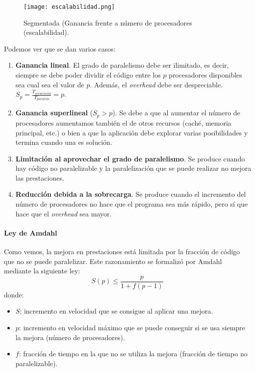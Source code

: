 \documentclass[12pt,spanish]{article}
\begin{document}
\begin{figure}[H]
	\centering
	\texttt{[image: escalabilidad.png]}
	\caption{Segmentada (Ganancia frente a número de procesadores (escalabilidad).}
\end{figure}

Podemos ver que se dan varios casos:
\begin{enumerate}
	\item \textbf{Ganancia lineal}. El grado de paralelismo debe ser ilimitado, es decir, siempre se debe poder dividir el código entre los $p$ procesadores disponibles sea cual sea el valor de $p$. Además, el \textit{overhead} debe ser despreciable. $S_p=\frac{T_{secuencial}}{T_{paralelo}}=p$.
	\item \textbf{Ganancia superlineal} ($S_p>p$). Se debe a que al aumentar el número de procesadores aumentamos también el de otros recursos (caché, memoria principal, etc.) o bien a que la aplicación debe explorar varias posibilidades y termina cuando una es solución. 
	\item \textbf{Limitación al aprovechar el grado de paralelismo}. Se produce cuando hay código no paralelizable y la paralelización que se puede realizar no mejora las prestaciones.
	\item \textbf{Reducción debida a la sobrecarga}. Se produce cuando el incremento del número de procesadores no hace que el programa sea más rápido, pero sí que hace que el \textit{overhead} sea mayor.
\end{enumerate}


\paragraph{Ley de Amdahl}

Como vemos, la mejora en prestaciones está limitada por la fracción de código que no se puede paralelizar. Este razonamiento se formalizó por Amdahl mediante la siguiente ley:
\begin{equation}
	S(p)\leq \frac{p}{1+f(p-1)}
\end{equation}
donde:
\begin{itemize}
	\item $S$: incremento en velocidad que se consigue al aplicar una mejora.
	\item $p$: incremento en velocidad máximo que se puede conseguir si se usa siempre la mejora (número de procesadores).
	\item $f$: fracción de tiempo en la que no se utiliza la mejora (fracción de tiempo no paralelizable).
\end{itemize}
\end{document}

